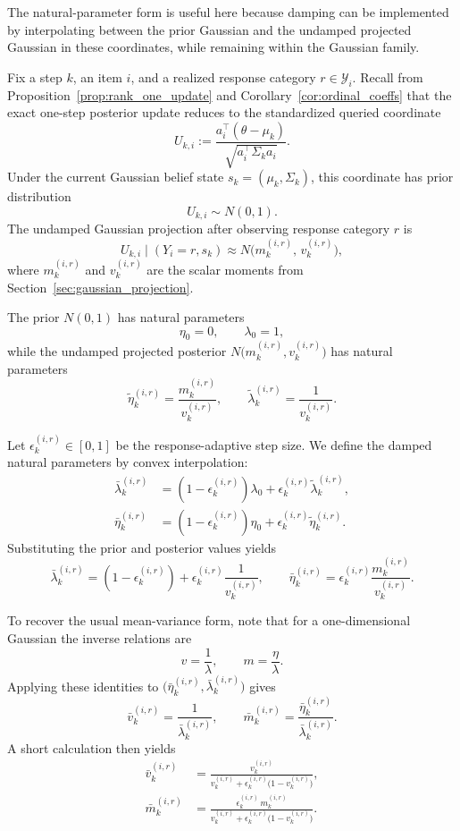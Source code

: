 \documentclass{article}
\begin{document}
The natural-parameter form is useful here because damping can be implemented by
interpolating between the prior Gaussian and the undamped projected Gaussian in
these coordinates, while remaining within the Gaussian family.

Fix a step $k$, an item $i$, and a realized response category
$r \in \mathcal Y_i$. Recall from Proposition~\ref{prop:rank_one_update}
and Corollary~\ref{cor:ordinal_coeffs} that the exact one-step posterior update
reduces to the standardized queried coordinate
\[
U_{k,i}
:=
\frac{a_i^\top(\theta-\mu_k)}{\sqrt{a_i^\top\Sigma_k a_i}}.
\]
Under the current Gaussian belief state $s_k=(\mu_k,\Sigma_k)$, this coordinate
has prior distribution
\[
U_{k,i}\sim N(0,1).
\]
The undamped Gaussian projection after observing response category $r$ is
\[
U_{k,i}\mid(Y_i=r,s_k)
\approx
N\!\bigl(m_k^{(i,r)},\,v_k^{(i,r)}\bigr),
\]
where $m_k^{(i,r)}$ and $v_k^{(i,r)}$ are the scalar moments from
Section~\ref{sec:gaussian_projection}.

The prior $N(0,1)$ has natural parameters
\[
\eta_0=0,
\qquad
\lambda_0=1,
\]
while the undamped projected posterior
$N\!\bigl(m_k^{(i,r)},v_k^{(i,r)}\bigr)$ has natural parameters
\[
\tilde{\eta}_k^{(i,r)}=\frac{m_k^{(i,r)}}{v_k^{(i,r)}},
\qquad
\tilde{\lambda}_k^{(i,r)}=\frac{1}{v_k^{(i,r)}}.
\]

Let $\epsilon_k^{(i,r)}\in[0,1]$ be the response-adaptive step size. We define
the damped natural parameters by convex interpolation:
\begin{align*}
\bar{\lambda}_k^{(i,r)}
&=
(1-\epsilon_k^{(i,r)})\lambda_0
+
\epsilon_k^{(i,r)}\tilde{\lambda}_k^{(i,r)},
\label{eq:app_bar_lambda}
\\
\bar{\eta}_k^{(i,r)}
&=
(1-\epsilon_k^{(i,r)})\eta_0
+
\epsilon_k^{(i,r)}\tilde{\eta}_k^{(i,r)}.
\label{eq:app_bar_eta}
\end{align*}
Substituting the prior and posterior values yields
\[
\bar{\lambda}_k^{(i,r)}
=
(1-\epsilon_k^{(i,r)})
+
\epsilon_k^{(i,r)}\frac{1}{v_k^{(i,r)}},
\qquad
\bar{\eta}_k^{(i,r)}
=
\epsilon_k^{(i,r)}\frac{m_k^{(i,r)}}{v_k^{(i,r)}}.
\]

To recover the usual mean-variance form, note that for a one-dimensional Gaussian
the inverse relations are
\[
v=\frac{1}{\lambda},
\qquad
m=\frac{\eta}{\lambda}.
\]
Applying these identities to
$\bigl(\bar{\eta}_k^{(i,r)},\bar{\lambda}_k^{(i,r)}\bigr)$ gives
\[
\bar{v}_k^{(i,r)}=\frac{1}{\bar{\lambda}_k^{(i,r)}},
\qquad
\bar{m}_k^{(i,r)}=\frac{\bar{\eta}_k^{(i,r)}}{\bar{\lambda}_k^{(i,r)}}.
\]
A short calculation then yields
\begin{align*}
\bar{v}_k^{(i,r)}
&=
\frac{v_k^{(i,r)}}
     {v_k^{(i,r)}+\epsilon_k^{(i,r)}\bigl(1-v_k^{(i,r)}\bigr)},
\label{eq:app_bar_v}
\\
\bar{m}_k^{(i,r)}
&=
\frac{\epsilon_k^{(i,r)}\,m_k^{(i,r)}}
     {v_k^{(i,r)}+\epsilon_k^{(i,r)}\bigl(1-v_k^{(i,r)}\bigr)}.
\label{eq:app_bar_m}
\end{align*}
\end{document}
